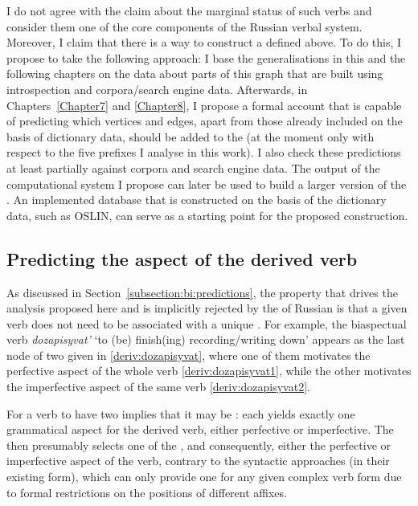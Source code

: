I do not agree with the claim about the marginal status of such verbs and consider them one of the core components of the Russian verbal system. Moreover, I claim that there is a way to construct a  defined above. To do this, I propose to take the following approach: I base the generalisations in this and the following chapters on the data about parts of this graph that are built using introspection and corpora/search engine data. Afterwards, in Chapters~\ref{Chapter7} and \ref{Chapter8}, I propose a formal account that is capable of predicting which vertices and edges, apart from those already included on the basis of dictionary data, should be added to the  (at the moment only with respect to the five prefixes I analyse in this work). I also check these predictions at least partially against corpora and search engine data. The output of the computational system I propose can later be used to build a larger version of the . An implemented database that is constructed on the basis of the dictionary data, such as OSLIN, can serve as a starting point for the proposed construction.

\subsection{Predicting the aspect of the derived verb}\label{subsection:predict}
As discussed in Section~\ref{subsection:bi:predictions}, the property that drives the analysis proposed here and is implicitly rejected by the  of Russian  is that a given verb does not need to be associated with a unique . For example, the biaspectual verb \textit{dozapisyvat'} `to (be) finish(ing) recording/writing down' appears as the last node of two  given in \ref{deriv:dozapisyvat}, where one of them motivates the perfective aspect of the whole verb \ref{deriv:dozapisyvat1}, while the other motivates the imperfective aspect of the same verb \ref{deriv:dozapisyvat2}.

For a verb to have two  implies that it may be : each  yields exactly one grammatical aspect for the derived verb, either perfective or imperfective. The  then presumably selects one of the , and consequently, either the perfective or imperfective aspect of the verb, contrary to the syntactic approaches (in their existing form), which can only provide one  for any given complex verb form due to formal restrictions on the positions of different affixes.

